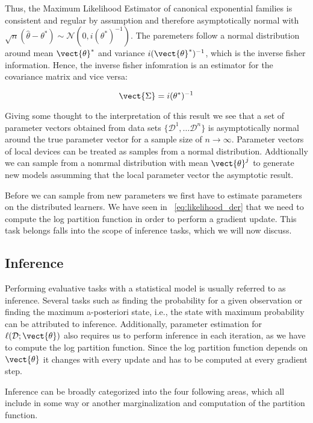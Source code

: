         Thus, the Maximum Likelihood Estimator of canonical exponential families is consistent and  regular by assumption and therefore asymptotically normal with $\sqrt{n}(\hat{\theta} - \theta^*) \sim \mathcal{N}(0, i(\theta^*)^{-1})$.
        The paremeters follow a normal distribution around mean $\vect{\theta}^*$ and variance $i(\vect{\theta}^*)^{-1}$, which is the inverse fisher information.
        Hence, the inverse fisher infomration is an estimator for the covariance matrix and vice versa:
        
        \begin{equation}
            \vect{\Sigma} =  i(\theta^*)^{-1}
        \end{equation}

        Giving some thought to the interpretation of this result we see that a set of parameter vectors obtained from data sets $\{\mathcal{D}^1, \ldots \mathcal{D}^n\}$ is asymptotically normal around the true parameter vector for a sample size of $n \rightarrow \infty$.
        Parameter vectors of local devices can be treated as samples from a normal distribution.
        Addtionally we can sample from a nomrmal distribution with mean $\vect{\theta}^j$ to generate new models assumming that the local parameter vector the asymptotic result.
        
        Before we can sample from new parameters we first have to estimate parameters on the distributed learners. 
        We have seen in \eq~\ref{eq:likelihood_der} that we need to compute the log partition function in order to perform a gradient update.
        This task belongs falls into the scope of inference tasks, which we will now discuss.

\subsection{Inference}
\label{ssec:inf}
Performing evaluative tasks with a statistical model is usually referred to as inference.
Several tasks such as finding the probability for a given observation or finding the maximum a-posteriori state, i.e., the state with maximum probability can be attributed to inference.
Additionally, parameter estimation for $\ell(\mathcal{D}; \vect{\theta})$ also requires us to perform inference in each iteration, as we have to compute the log partition function.
Since the log partition function depends on $\vect{\theta}$ it changes with every update and has to be computed at every gradient step.

Inference can be broadly categorized into the four  following areas, which all include in some way or another marginalization and computation of the partition function.

